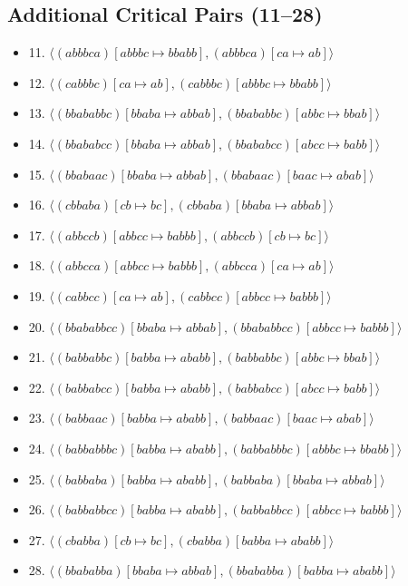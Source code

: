 \documentclass{article}
\begin{document}
\subsection{Additional Critical Pairs (11--28)}

\begin{itemize}
\item 11. $\langle (abbbca)[abbbc \mapsto bbabb], (abbbca)[ca \mapsto ab] \rangle$
\item 12. $\langle (cabbbc)[ca \mapsto ab], (cabbbc)[abbbc \mapsto bbabb] \rangle$
\item 13. $\langle (bbababbc)[bbaba \mapsto abbab], (bbababbc)[abbc \mapsto bbab] \rangle$
\item 14. $\langle (bbababcc)[bbaba \mapsto abbab], (bbababcc)[abcc \mapsto babb] \rangle$
\item 15. $\langle (bbabaac)[bbaba \mapsto abbab], (bbabaac)[baac \mapsto abab] \rangle$
\item 16. $\langle (cbbaba)[cb \mapsto bc], (cbbaba)[bbaba \mapsto abbab] \rangle$
\item 17. $\langle (abbccb)[abbcc \mapsto babbb], (abbccb)[cb \mapsto bc] \rangle$
\item 18. $\langle (abbcca)[abbcc \mapsto babbb], (abbcca)[ca \mapsto ab] \rangle$
\item 19. $\langle (cabbcc)[ca \mapsto ab], (cabbcc)[abbcc \mapsto babbb] \rangle$
\item 20. $\langle (bbababbcc)[bbaba \mapsto abbab], (bbababbcc)[abbcc \mapsto babbb] \rangle$
\item 21. $\langle (babbabbc)[babba \mapsto ababb], (babbabbc)[abbc \mapsto bbab] \rangle$
\item 22. $\langle (babbabcc)[babba \mapsto ababb], (babbabcc)[abcc \mapsto babb] \rangle$
\item 23. $\langle (babbaac)[babba \mapsto ababb], (babbaac)[baac \mapsto abab] \rangle$
\item 24. $\langle (babbabbbc)[babba \mapsto ababb], (babbabbbc)[abbbc \mapsto bbabb] \rangle$
\item 25. $\langle (babbaba)[babba \mapsto ababb], (babbaba)[bbaba \mapsto abbab] \rangle$
\item 26. $\langle (babbabbcc)[babba \mapsto ababb], (babbabbcc)[abbcc \mapsto babbb] \rangle$
\item 27. $\langle (cbabba)[cb \mapsto bc], (cbabba)[babba \mapsto ababb] \rangle$
\item 28. $\langle (bbababba)[bbaba \mapsto abbab], (bbababba)[babba \mapsto ababb] \rangle$
\end{itemize}
\end{document}
